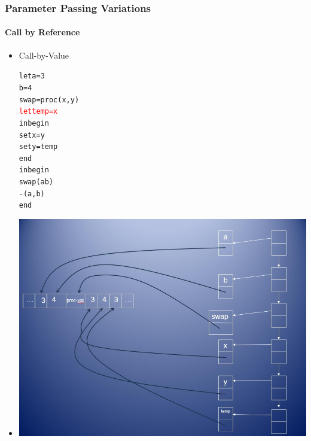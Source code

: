 \documentclass{beamer}
\begin{document}
\begin{frame}[fragile]
\frametitle{Parameter Passing Variations}
\framesubtitle{Call by Reference}
\begin{scriptsize}
\begin{itemize}
\item<1-> Call-by-Value
\begin{alltt}
\begin{tiny}
let a = 3
    b = 4
    swap = proc (x, y)
	        \textcolor{red}{let temp = x}
	        in begin
	             set x = y
	             set y = temp
	           end
in begin
     swap(a b)
     -(a, b)
   end
\end{tiny}
\end{alltt}

\item<1->
\begin{center}
\includegraphics[scale=0.35]{cbv-cbr3.jpg}
\end{center}

\end{itemize}
\end{scriptsize}
\end{frame}
\end{document}
